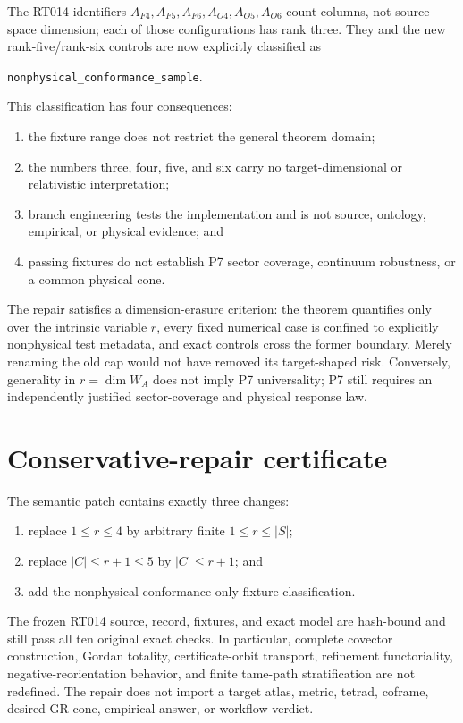 \documentclass[11pt]{article}
\begin{document}
The RT014 identifiers $A_{F4},A_{F5},A_{F6},A_{O4},A_{O5},A_{O6}$ count
columns, not source-space dimension; each of those configurations has rank
three.  They and the new rank-five/rank-six controls are now explicitly
classified as
\begin{center}
\texttt{nonphysical\_conformance\_sample}.
\end{center}
This classification has four consequences:
\begin{enumerate}[leftmargin=*]
  \item the fixture range does not restrict the general theorem domain;
  \item the numbers three, four, five, and six carry no target-dimensional
  or relativistic interpretation;
  \item branch engineering tests the implementation and is not source,
  ontology, empirical, or physical evidence; and
  \item passing fixtures do not establish P7 sector coverage, continuum
  robustness, or a common physical cone.
\end{enumerate}

The repair satisfies a dimension-erasure criterion: the theorem quantifies
only over the intrinsic variable $r$, every fixed numerical case is confined
to explicitly nonphysical test metadata, and exact controls cross the former
boundary.  Merely renaming the old cap would not have removed its target-shaped
risk.  Conversely, generality in $r=\dim W_A$ does not imply P7 universality;
P7 still requires an independently justified sector-coverage and physical
response law.

\section{Conservative-repair certificate}

The semantic patch contains exactly three changes:
\begin{enumerate}[leftmargin=*]
  \item replace $1\le r\le4$ by arbitrary finite
  $1\le r\le|S|$;
  \item replace $|C|\le r+1\le5$ by $|C|\le r+1$; and
  \item add the nonphysical conformance-only fixture classification.
\end{enumerate}

The frozen RT014 source, record, fixtures, and exact model are hash-bound and
still pass all ten original exact checks.  In particular, complete covector
construction, Gordan totality, certificate-orbit transport, refinement
functoriality, negative-reorientation behavior, and finite tame-path
stratification are not redefined.  The repair does not import a target atlas,
metric, tetrad, coframe, desired GR cone, empirical answer, or workflow
verdict.
\end{document}
